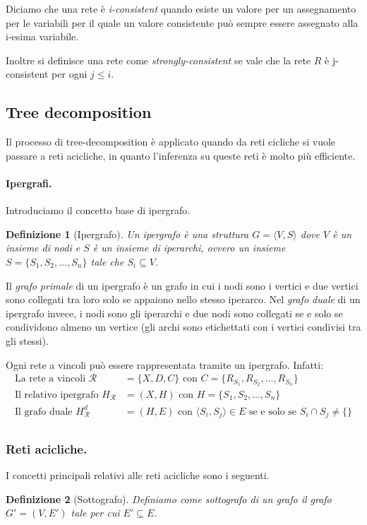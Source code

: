 \documentclass[a4paper, 11pt]{article}
\newtheorem{definit}{Definizione}[subsection]
\begin{document}
Diciamo che una rete è \textit{i-consistent} quando esiste un valore per un assegnamento per le variabili per il quale un valore consistente può sempre essere assegnato alla i-esima variabile.

Inoltre si definisce una rete come \textit{strongly-consistent} se vale che la rete $R$ è j-consistent per ogni $j \leq i$.

\subsection{Tree decomposition}
Il processo di tree-decomposition è applicato quando da reti cicliche si vuole passare a reti acicliche, in quanto l'inferenza su queste reti è molto più efficiente. 

\paragraph{Ipergrafi.}Introduciamo il concetto base di ipergrafo.
\begin{definit}[Ipergrafo]
	Un ipergrafo è una struttura $G= \langle V, S \rangle$ dove $V$ è un insieme di nodi e $S$ è un insieme di iperarchi, ovvero un insieme $S = \lbrace S_1, S_2, \dots, S_n \rbrace$ tale che $S_i \subseteq V$.
\end{definit}

Il \textit{grafo primale} di un ipergrafo è un grafo in cui i nodi sono i vertici e due vertici sono collegati tra loro solo se appaiono nello stesso iperarco.  Nel \textit{grafo duale} di un ipergrafo invece, i nodi sono gli iperarchi e due nodi sono collegati se e solo se condividono almeno un vertice (gli archi sono etichettati con i vertici condivisi tra gli stessi).

Ogni rete a vincoli può essere rappresentata tramite un ipergrafo. Infatti:
\begin{align*}
	\text{La rete a vincoli }\mathcal{R} &= \lbrace X, D, C \rbrace \text{ con } C= \lbrace R_{S_1}, R_{S_2}, \dots, R_{S_n} \rbrace \\
	\text{Il relativo ipergrafo } H_\mathcal{R} &= (X,H)  \text{ con } H = \lbrace S_1, S_2, \dots, S_n \rbrace \\
	\text{Il grafo duale } H_\mathcal{R}^d &= (H, E) \text{ con } \langle S_i, S_j \rangle \in E \text{ se e solo se } S_i \cap S_j \neq \lbrace \rbrace\\
\end{align*}

\subsubsection{Reti acicliche.} 
I concetti principali relativi alle reti acicliche sono i seguenti.
\begin{definit}[Sottografo]
	Definiamo come sottografo di un grafo il grafo $G' = (V, E')$ tale per cui $E' \subseteq E$.
\end{definit}
\end{document}
